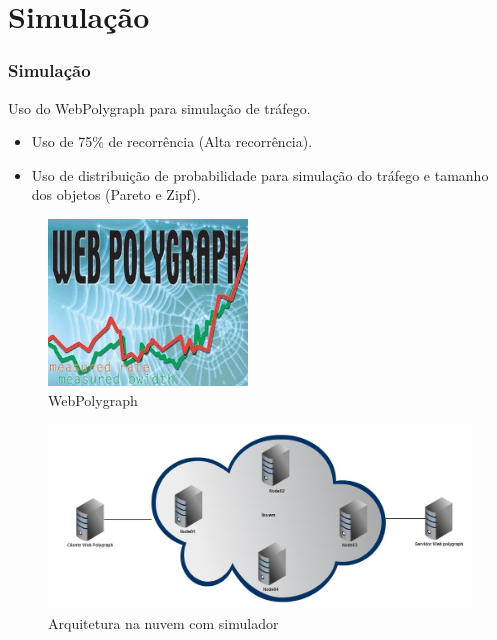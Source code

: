 \documentclass{beamer}
\begin{document}
    \section{Simulação}
    \begin{frame}
     \frametitle{Simulação}
      Uso do WebPolygraph para simulação de tráfego.
      \begin{itemize}
       \item Uso de 75\% de recorrência (Alta recorrência).
       \item Uso de distribuição de probabilidade para simulação do tráfego e tamanho dos objetos (Pareto e Zipf).       
      \end{itemize}

      \begin{figure}
       \centering
       \includegraphics[scale=0.5]{imagens/webpolygraph.jpg}
       \caption{WebPolygraph}
      \end{figure}
    \end{frame}

    \begin{frame}
     \begin{figure}
      \centering
      \includegraphics[scale=0.2]{imagens/simulador.jpg}
      \caption{Arquitetura na nuvem com simulador}
     \end{figure}
    \end{frame}

\end{document}

